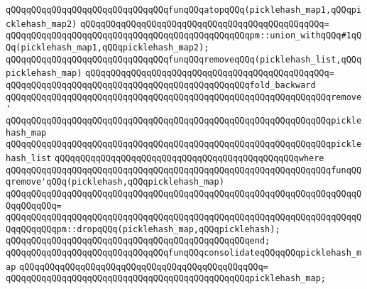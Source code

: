 \newline
\newline
\verb|qQQqqQQqqQQqqQQqqQQqqQQqqQQqqQQqfunqQQqatopqQQq(picklehash_map1,qQQqpicklehash_map2)|\newline
\verb|qQQqqQQqqQQqqQQqqQQqqQQqqQQqqQQqqQQqqQQqqQQqqQQq=|\newline
\verb|qQQqqQQqqQQqqQQqqQQqqQQqqQQqqQQqqQQqqQQqqQQqqQQqpm::union_withqQQq#1qQQq(picklehash_map1,qQQqpicklehash_map2);|\newline
\newline
\newline
\verb|qQQqqQQqqQQqqQQqqQQqqQQqqQQqqQQqfunqQQqremoveqQQq(picklehash_list,qQQqpicklehash_map)|\newline
\verb|qQQqqQQqqQQqqQQqqQQqqQQqqQQqqQQqqQQqqQQqqQQqqQQq=|\newline
\verb|qQQqqQQqqQQqqQQqqQQqqQQqqQQqqQQqqQQqqQQqqQQqqQQqfold_backward|\newline
\verb|qQQqqQQqqQQqqQQqqQQqqQQqqQQqqQQqqQQqqQQqqQQqqQQqqQQqqQQqqQQqqQQqremove'|\newline
\verb|qQQqqQQqqQQqqQQqqQQqqQQqqQQqqQQqqQQqqQQqqQQqqQQqqQQqqQQqqQQqqQQqpicklehash_map|\newline
\verb|qQQqqQQqqQQqqQQqqQQqqQQqqQQqqQQqqQQqqQQqqQQqqQQqqQQqqQQqqQQqqQQqpicklehash_list|\newline
\verb|qQQqqQQqqQQqqQQqqQQqqQQqqQQqqQQqqQQqqQQqqQQqqQQqwhere|\newline
\verb|qQQqqQQqqQQqqQQqqQQqqQQqqQQqqQQqqQQqqQQqqQQqqQQqqQQqqQQqqQQqqQQqfunqQQqremove'qQQq(picklehash,qQQqpicklehash_map)|\newline
\verb|qQQqqQQqqQQqqQQqqQQqqQQqqQQqqQQqqQQqqQQqqQQqqQQqqQQqqQQqqQQqqQQqqQQqqQQqqQQqqQQq=|\newline
\verb|qQQqqQQqqQQqqQQqqQQqqQQqqQQqqQQqqQQqqQQqqQQqqQQqqQQqqQQqqQQqqQQqqQQqqQQqqQQqqQQqpm::dropqQQq(picklehash_map,qQQqpicklehash);|\newline
\verb|qQQqqQQqqQQqqQQqqQQqqQQqqQQqqQQqqQQqqQQqqQQqqQQqend;|\newline
\newline
\newline
\verb|qQQqqQQqqQQqqQQqqQQqqQQqqQQqqQQqfunqQQqconsolidateqQQqqQQqpicklehash_map|\newline
\verb|qQQqqQQqqQQqqQQqqQQqqQQqqQQqqQQqqQQqqQQqqQQqqQQq=|\newline
\verb|qQQqqQQqqQQqqQQqqQQqqQQqqQQqqQQqqQQqqQQqqQQqqQQqpicklehash_map;|\newline
\newline
\newline
